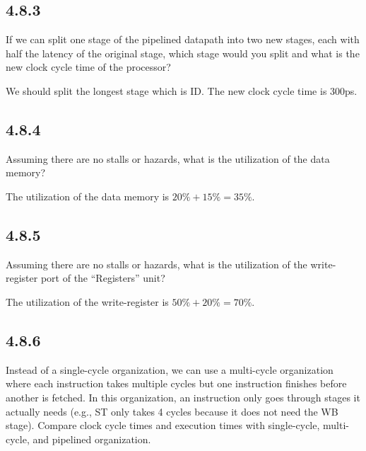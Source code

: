 \documentclass[paper=a4, fontsize=11pt]{scrartcl} %
\begin{document}
\subsection{4.8.3}
\begin{fancyquotes}
    If we can split one stage of the pipelined datapath into two new stages, each with half the latency of the original stage, which stage would you split and what is the new clock cycle time of the processor?
\end{fancyquotes}

We should split the longest stage which is ID.
The new clock cycle time is 300ps.


\subsection{4.8.4}
\begin{fancyquotes}
    Assuming there are no stalls or hazards, what is the utilization of the data memory?
\end{fancyquotes}

The utilization of the data memory is $20\% + 15\% = 35\%$.


\subsection{4.8.5}
\begin{fancyquotes}
    Assuming there are no stalls or hazards, what is the utilization of the write-register port of the ``Registers'' unit?
\end{fancyquotes}

The utilization of the write-register is $50\% + 20\% = 70\%$.


\subsection{4.8.6}
\begin{fancyquotes}
    Instead of a single-cycle organization, we can use a multi-cycle organization where each instruction takes multiple cycles but one instruction finishes before another is fetched. In this organization, an instruction only goes through stages it actually needs (e.g., ST only takes 4 cycles because it does not need the WB stage). Compare clock cycle times and execution times with single-cycle, multi-cycle, and pipelined organization.
\end{fancyquotes}
\end{document}
